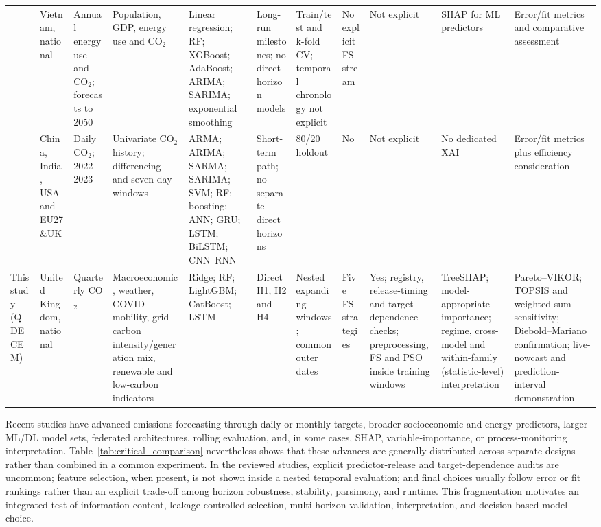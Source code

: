 \documentclass[preprint,12pt]{elsarticle}
\newcommand{\qdecem}{Q-DECEM}
\begin{document}
\begin{landscape}
\begin{longtable}{@{}P{1.60cm}P{1.45cm}P{1.55cm}P{2.05cm}P{2.00cm}P{1.35cm}P{1.75cm}P{1.35cm}P{1.65cm}P{1.70cm}P{1.90cm}@{}}
\citet{Le2024VietnamCO2} & Vietnam, national & Annual energy use and CO$_2$; forecasts to 2050 & Population, GDP, energy use and CO$_2$ & Linear regression; RF; XGBoost; AdaBoost; ARIMA; SARIMA; exponential smoothing & Long-run milestones; no direct horizon models & Train/test and k-fold CV; temporal chronology not explicit & No explicit FS stream & Not explicit & SHAP for ML predictors & Error/fit metrics and comparative assessment \\
\citet{Ajala2025DailyCO2} & China, India, USA and EU27\&UK & Daily CO$_2$; 2022--2023 & Univariate CO$_2$ history; differencing and seven-day windows & ARMA; ARIMA; SARMA; SARIMA; SVM; RF; boosting; ANN; GRU; LSTM; BiLSTM; CNN--RNN & Short-term path; no separate direct horizons & 80/20 holdout & No & Not explicit & No dedicated XAI & Error/fit metrics plus efficiency consideration \\
This study (\qdecem{}) & United Kingdom, national & Quarterly CO$_2$ & Macroeconomic, weather, COVID mobility, grid carbon intensity/\allowbreak generation mix, renewable and low-carbon indicators & Ridge; RF; LightGBM; CatBoost; LSTM & Direct H1, H2 and H4 & Nested expanding windows; common outer dates & Five FS strategies & Yes; registry, release-timing and target-dependence checks; preprocessing, FS and PSO inside training windows & TreeSHAP; model-appropriate importance; regime, cross-model and within-family (statistic-level) interpretation & Pareto--VIKOR; TOPSIS and weighted-sum sensitivity; Diebold--Mariano confirmation; live-nowcast and prediction-interval demonstration \\
\end{longtable}
\endgroup
\end{landscape}
\ClearShipoutPictureFG
\pagestyle{plain}

Recent studies have advanced emissions forecasting through daily or monthly targets, broader socioeconomic and energy predictors, larger ML/DL model sets, federated architectures, rolling evaluation, and, in some cases, SHAP, variable-importance, or process-monitoring interpretation. Table~\ref{tab:critical_comparison} nevertheless shows that these advances are generally distributed across separate designs rather than combined in a common experiment. In the reviewed studies, explicit predictor-release and target-dependence audits are uncommon; feature selection, when present, is not shown inside a nested temporal evaluation; and final choices usually follow error or fit rankings rather than an explicit trade-off among horizon robustness, stability, parsimony, and runtime. This fragmentation motivates an integrated test of information content, leakage-controlled selection, multi-horizon validation, interpretation, and decision-based model choice.
\end{document}
